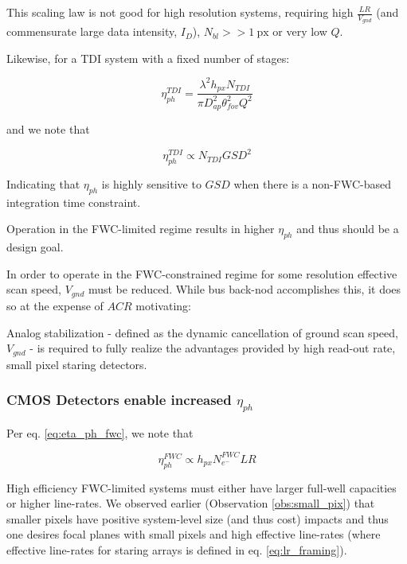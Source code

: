 \documentclass[10pt,journal]{IEEEtran}  %
\begin{document}
This scaling law is not good for high resolution systems, requiring high $\frac{LR}{V_{gnd}}$ (and commensurate large data intensity, $I_{D}$), $N_{bl} >> 1 \: \textrm{px}$ or very low $Q$.

Likewise, for a TDI system with a fixed number of stages:

\begin{equation}
    \eta_{ph}^{TDI} = \frac{\lambda^2 h_{px} N_{TDI}}{\pi D_{ap}^2 \theta_{fov}^2 Q^2}
\end{equation}

and we note that 

\begin{equation}
    \label{eq:eta_ph_tdi_scaling}
    \eta_{ph}^{TDI} \propto N_{TDI} GSD^2
\end{equation}

Indicating that $\eta_{ph}$ is highly sensitive to $GSD$ when there is a non-FWC-based integration time constraint.

\begin{observation}
Operation in the FWC-limited regime results in higher $\eta_{ph}$ and thus should be a design goal.
\end{observation}

In order to operate in the FWC-constrained regime for some resolution effective scan speed, $V_{gnd}$ must be reduced.  While bus back-nod accomplishes this, it does so at the expense of $ACR$ motivating:

\begin{observation}
Analog stabilization - defined as the dynamic cancellation of ground scan speed, $V_{gnd}$ - is required to fully realize the advantages provided by high read-out rate, small pixel staring detectors.
\end{observation}

\subsubsection{CMOS Detectors enable increased $\eta_{ph}$}

Per eq. \ref{eq:eta_ph_fwc}, we note that 

\begin{equation}
    \eta_{ph}^{FWC} \propto h_{px}N_{e^-}^{FWC}LR
\end{equation}

High efficiency FWC-limited systems must either have larger full-well capacities or higher line-rates.  We observed earlier (Observation \ref{obs:small_pix}) that smaller pixels have positive system-level size (and thus cost) impacts and thus one desires focal planes with small pixels and high effective line-rates (where effective line-rates for staring arrays is defined in eq. \ref{eq:lr_framing}).
\end{document}
